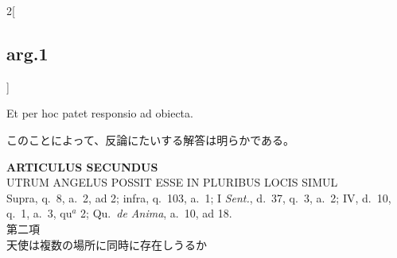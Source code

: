 \documentclass[paper=a4paper,fontsize=10pt,jafontsize=9pt,titlepage]{jlreq}
\begin{document}
\begin{paracol}{2}[\subsection{arg.1}]
\switchcolumn*

Et per hoc patet responsio ad obiecta.

\switchcolumn

このことによって、反論にたいする解答は明らかである。

\end{paracol}
\newpage
{}
{}
\setcounter{section}{2}
\setcounter{subsection}{0}


\begin{center}
 {\Large {\bfseries ARTICULUS SECUNDUS}}\\
 {\large UTRUM ANGELUS POSSIT ESSE IN PLURIBUS LOCIS SIMUL}\\
 {\footnotesize Supra, q.~8, a.~2, ad 2; infra, q.~103, a.~1; I
 {\itshape Sent.}, d.~37, q.~3, a.~2; IV, d.~10, q.~1, a.~3, qu$^a$ 2;
 Qu.~{\itshape de Anima}, a.~10, ad 18.}\\
 {\Large 第二項\\天使は複数の場所に同時に存在しうるか}
\end{center}
\end{document}
